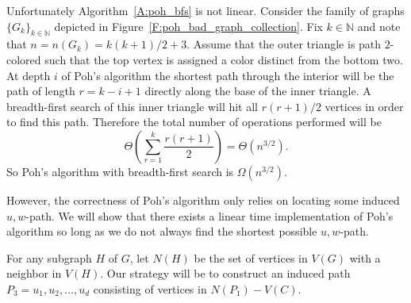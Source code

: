 \documentclass[12pt,letterpaper]{article}
\theoremstyle{plain}
\theoremstyle{definition}
\theoremstyle{break}
\begin{document}
Unfortunately Algorithm~\ref{A:poh_bfs}
is not linear. Consider the family of
graphs $\{G_k\}_{k\in\mathbb{N}}$ depicted in
Figure~\ref{F:poh_bad_graph_collection}.
Fix $k\in\mathbb{N}$ and note that
$n=n(G_k)=k(k+1)/2+3$. Assume
that the outer triangle is path $2$-colored such that the top vertex is
assigned a color distinct from the bottom two. At depth $i$ of Poh's
algorithm the shortest path through the interior will be the path of length
$r=k-i+1$ directly along the base of the inner triangle. A breadth-first search
of this inner triangle will hit all $r(r+1)/2$ vertices in order to find this
path. Therefore the total number of operations performed will be
\[
    \Theta\left( \sum_{r=1}^k\frac{r(r+1)}{2} \right)=\Theta(n^{3/2}).
\]
So Poh's algorithm with breadth-first search is $\Omega(n^{3/2})$.

However, the correctness of Poh's algorithm only relies on
locating some induced $u,w$-path.
We will show that there exists a linear time implementation of Poh's
algorithm so long as we do not always find the shortest possible $u,w$-path.

For any subgraph $H$ of $G$, let $N(H)$ be the set of vertices in $V(G)$ with a
neighbor in $V(H)$. Our strategy will be to construct an induced
path $P_3=u_1,u_2,\ldots,u_d$ consisting of vertices in $N(P_1)-V(C)$.
\end{document}
